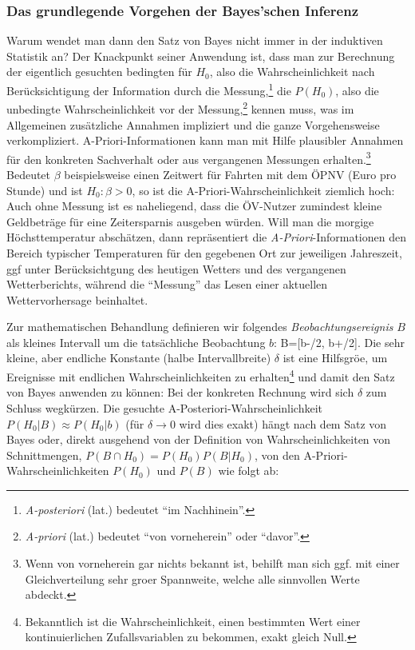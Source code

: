 \subsubsection*{Das grundlegende Vorgehen der Bayes'schen Inferenz}
%
Warum wendet man dann den Satz von Bayes nicht immer in der induktiven
Statistik an? Der Knackpunkt seiner Anwendung ist, dass man zur
Berechnung der  eigentlich gesuchten bedingten
 f\"ur $H_0$, also die
Wahr\-schein\-lich\-keit nach Ber\"ucksichtigung der Information durch die
Messung,\footnote{\emph{A-posteriori} (lat.) bedeutet ``im
  Nachhinein''.} die
 $P(H_0)$, also die unbedingte
Wahr\-schein\-lich\-keit vor der Messung,\footnote{\emph{A-priori} (lat.)
  bedeutet ``von vorneherein'' oder ``davor''.} kennen muss, was im
Allgemeinen zus\"atzliche Annahmen impliziert und die ganze
Vorgehensweise verkompliziert. A-Priori-Informationen kann man mit
Hilfe plausibler Annahmen f\"ur den konkreten Sachverhalt oder aus
vergangenen Messungen erhalten.\footnote{Wenn von vorneherein gar
  nichts bekannt ist, behilft man sich ggf. mit einer Gleichverteilung sehr
  gro\3er Spannweite, welche alle sinnvollen Werte abdeckt.}  Bedeutet
$\beta$ beispielsweise einen Zeitwert f\"ur Fahrten mit dem \"OPNV
(Euro pro Stunde) und
ist $H_0: \beta>0$, so ist die A-Priori-Wahr\-schein\-lich\-keit ziemlich
hoch: Auch ohne Messung ist es naheliegend, dass die \"OV-Nutzer
zumindest kleine Geldbetr\"age f\"ur eine Zeitersparnis ausgeben
w\"urden. Will man die morgige H\"ochsttemperatur absch\"atzen, dann
repr\"asentiert die \emph{A-Priori}-Informationen den Bereich
typischer Temperaturen f\"ur den gegebenen Ort zur jeweiligen Jahreszeit,
ggf unter Ber\"ucksichtgung des heutigen Wetters und des vergangenen
Wetterberichts, w\"ahrend die ``Messung'' das Lesen einer aktuellen Wettervorhersage
beinhaltet.

Zur mathematischen Behandlung 
definieren wir
folgendes \emph{Beobachtungsereignis} $B$ als kleines Intervall um die
tats\"achliche Beobachtung $b$: 
\be
B=[b-\delta/2, b+\delta/2].
\ee
Die sehr kleine, aber endliche Konstante (halbe Intervallbreite)
$\delta$ ist eine Hilfsgr\"o\3e, um Ereignisse mit endlichen
Wahr\-schein\-lich\-keiten zu erhalten\footnote{Bekanntlich ist die
Wahr\-schein\-lich\-keit, einen bestimmten Wert einer kontinuierlichen
Zufallsvariablen zu bekommen,  exakt gleich Null.} und damit den Satz
von Bayes anwenden zu k\"onnen: Bei der konkreten Rechnung wird sich
$\delta$ zum Schluss wegk\"urzen.
Die gesuchte A-Posteriori-Wahr\-schein\-lich\-keit $P(H_0|B) \approx
P(H_0|b)$ (f\"ur $\delta\to 0$ wird dies exakt)
h\"angt nach dem Satz von Bayes oder, direkt ausgehend von der Definition von
Wahr\-schein\-lich\-keiten von Schnittmengen, 
$P(B \cap H_0)=P(H_0)P(B|H_0)$, von den A-Priori-Wahr\-schein\-lich\-keiten $P(H_0)$ und
$P(B)$ wie folgt ab:

